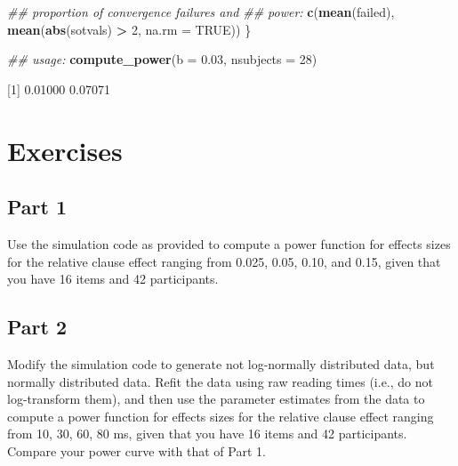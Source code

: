 \documentclass[12pt,]{krantz}
\newenvironment{Shaded}{\begin{snugshade}}{\end{snugshade}}
\newcommand{\CommentTok}[1]{\textcolor[rgb]{0.56,0.35,0.01}{\textit{#1}}}
\newcommand{\DataTypeTok}[1]{\textcolor[rgb]{0.13,0.29,0.53}{#1}}
\newcommand{\DecValTok}[1]{\textcolor[rgb]{0.00,0.00,0.81}{#1}}
\newcommand{\FloatTok}[1]{\textcolor[rgb]{0.00,0.00,0.81}{#1}}
\newcommand{\KeywordTok}[1]{\textcolor[rgb]{0.13,0.29,0.53}{\textbf{#1}}}
\newcommand{\NormalTok}[1]{#1}
\newcommand{\OperatorTok}[1]{\textcolor[rgb]{0.81,0.36,0.00}{\textbf{#1}}}
\newcommand{\OtherTok}[1]{\textcolor[rgb]{0.56,0.35,0.01}{#1}}
\newcommand{\StringTok}[1]{\textcolor[rgb]{0.31,0.60,0.02}{#1}}
\begin{document}
\begin{Shaded}
\begin{Highlighting}[]
  \CommentTok{## proportion of convergence failures and}
  \CommentTok{## power:}
  \KeywordTok{c}\NormalTok{(}\KeywordTok{mean}\NormalTok{(failed), }\KeywordTok{mean}\NormalTok{(}\KeywordTok{abs}\NormalTok{(sotvals) }\OperatorTok{>}\StringTok{ }\DecValTok{2}\NormalTok{, }
    \DataTypeTok{na.rm =} \OtherTok{TRUE}\NormalTok{))}
\NormalTok{\}}
\end{Highlighting}
\end{Shaded}

\begin{Shaded}
\begin{Highlighting}[]
\CommentTok{## usage:}
\KeywordTok{compute_power}\NormalTok{(}\DataTypeTok{b =} \FloatTok{0.03}\NormalTok{, }\DataTypeTok{nsubjects =} \DecValTok{28}\NormalTok{)}
\end{Highlighting}
\end{Shaded}

{[}1{]} 0.01000 0.07071

\hypertarget{sec:Simulationexercises}{%
\section{Exercises}\label{sec:Simulationexercises}}

\hypertarget{sec:SimulationexercisesPart1}{%
\subsection{Part 1}\label{sec:SimulationexercisesPart1}}

Use the simulation code as provided to compute a power function for effects sizes for the relative clause effect ranging from 0.025, 0.05, 0.10, and 0.15, given that you have 16 items and 42 participants.

\hypertarget{sec:SimulationexercisesPart2}{%
\subsection{Part 2}\label{sec:SimulationexercisesPart2}}

Modify the simulation code to generate not log-normally distributed data, but normally distributed data. Refit the \citet{grodner} data using raw reading times (i.e., do not log-transform them), and then use the parameter estimates from the data to compute a power function for effects sizes for the relative clause effect ranging from 10, 30, 60, 80 ms, given that you have 16 items and 42 participants. Compare your power curve with that of Part 1.
\end{document}
